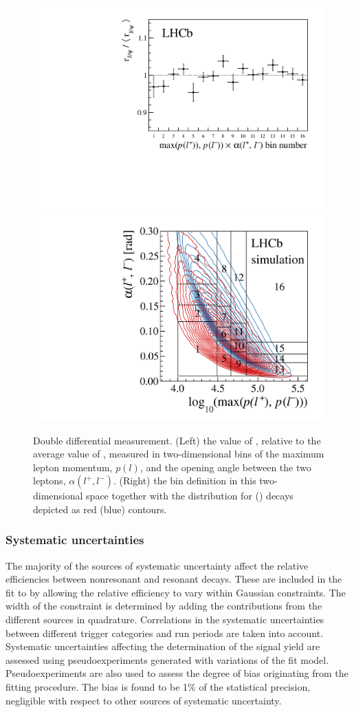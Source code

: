 \begin{figure}[!htbp]
   \begin{center}
   \includegraphics[width=0.45\linewidth]{figures/Fig10a.pdf}
    \includegraphics[height=0.32\linewidth]{figures/Fig10b.pdf}
   \end{center}
     \caption{Double differential \rjpsi measurement. (Left) the value of \rjpsi, relative to the average value of \rjpsi, measured in two-dimensional bins of the maximum lepton momentum, $p(l)$, and the opening angle between the two leptons, $\alpha(l^+,l^-)$. (Right) the bin definition in this two-dimensional space together with the
     distribution for \BuKee (\BuJpsiKee) decays depicted as red (blue) contours.}
    \label{fig:rjpsi_bin}
\end{figure}




\subsubsection*{Systematic uncertainties}

The majority of the sources of systematic uncertainty affect the relative efficiencies between nonresonant and resonant decays. These are included in the fit to \RK by allowing the relative efficiency to vary within Gaussian constraints. The width of the constraint is determined by adding the contributions from the different sources in quadrature. Correlations in the systematic uncertainties between different trigger categories and run periods are taken into account. Systematic uncertainties affecting the determination of the signal yield are assessed using pseudoexperiments generated with variations of the fit model. Pseudoexperiments are also used to assess the degree of bias originating from the fitting procedure. The bias is found to be 1\% of the statistical precision, \ie negligible with respect to other sources of systematic uncertainty.

